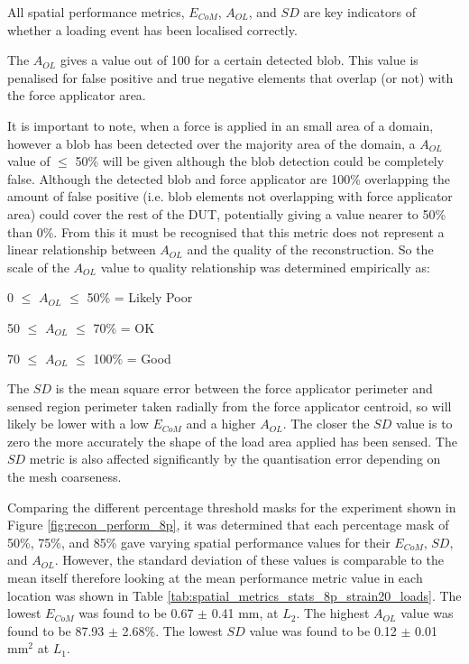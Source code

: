 All spatial performance metrics, $E_{CoM}$, $A_{OL}$, and $S\!D$ are key indicators of whether a loading event has been localised correctly.



The $A_{OL}$ gives a value out of 100 for a certain detected blob. This value is penalised for false positive and true negative elements that overlap (or not) with the force applicator area.

It is important to note, when a force is applied in an small area of a domain, however a blob has been detected over the majority area of the domain, a $A_{OL}$ value of $\leq$ 50\% will be given although the blob detection could be completely false. Although the detected blob and force applicator are 100\% overlapping the amount of false positive (i.e. blob elements not overlapping with force applicator area) could cover the rest of the DUT, potentially giving a value nearer to 50\% than 0\%. From this it must be recognised that this metric does not represent a linear relationship between $A_{OL}$ and the quality of the reconstruction. So the scale of the $A_{OL}$ value to quality relationship was determined empirically as:
\vspace{-0.4cm}
\begin{center}
    \item 0 $\leq$ $A_{OL}$ $\leq$ 50\% = Likely Poor
    \item 50 $\leq$ $A_{OL}$ $\leq$ 70\% = OK
    \item 70 $\leq$ $A_{OL}$ $\leq$ 100\% = Good
\end{center}

The $S\!D$ is the mean square error between the force applicator perimeter and sensed region perimeter taken radially from the force applicator centroid, so will likely be lower with a low $E_{CoM}$ and a higher $A_{OL}$. The closer the $S\!D$ value is to zero the more accurately the shape of the load area applied has been sensed. The $S\!D$ metric is also affected significantly by the quantisation error depending on the mesh coarseness.

Comparing the different percentage threshold masks for the experiment shown in Figure \ref{fig:recon_perform_8p}, it was determined that each percentage mask of 50\%, 75\%, and 85\% gave varying spatial performance values for their $E_{CoM}$, $S\!D$, and $A_{OL}$. However, the standard deviation of these values is comparable to the mean itself therefore looking at the mean performance metric value in each location was shown in Table \ref{tab:spatial_metrics_stats_8p_strain20_loads}. The lowest $E_{CoM}$ was found to be 0.67 $\pm$ 0.41 mm, at $L_2$. The highest $A_{OL}$ value was found to be 87.93 $\pm$ 2.68\%. The lowest $S\!D$ value was found to be 0.12 $\pm$ 0.01 mm$^2$ at $L_1$.

